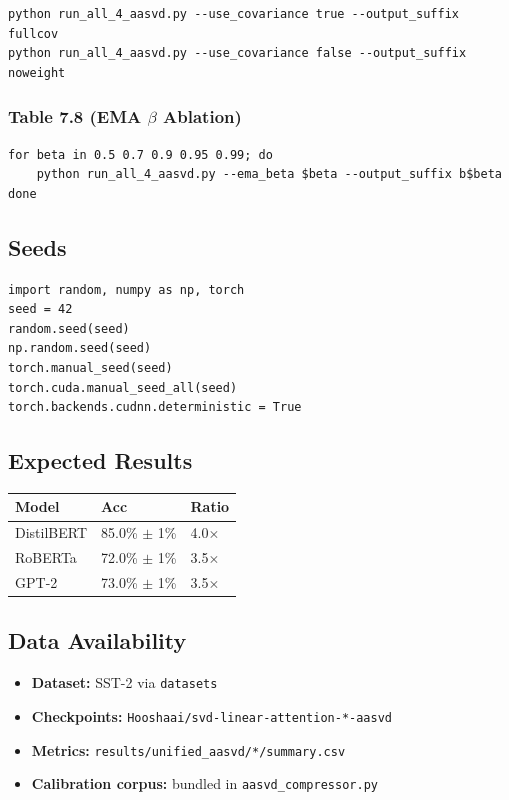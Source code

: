 \begin{lstlisting}
python run_all_4_aasvd.py --use_covariance true --output_suffix fullcov
python run_all_4_aasvd.py --use_covariance false --output_suffix noweight
\end{lstlisting}

\subsubsection{Table 7.8 (EMA $\beta$ Ablation)}

\begin{lstlisting}
for beta in 0.5 0.7 0.9 0.95 0.99; do
    python run_all_4_aasvd.py --ema_beta $beta --output_suffix b$beta
done
\end{lstlisting}

\subsection{Seeds}

\begin{lstlisting}
import random, numpy as np, torch
seed = 42
random.seed(seed)
np.random.seed(seed)
torch.manual_seed(seed)
torch.cuda.manual_seed_all(seed)
torch.backends.cudnn.deterministic = True
\end{lstlisting}

\subsection{Expected Results}

\begin{table}[H]
\centering
\small
\begin{tabular}{lll}
\toprule
\textbf{Model} & \textbf{Acc} & \textbf{Ratio} \\
\midrule
DistilBERT & 85.0\% $\pm$ 1\% & 4.0$\times$ \\
RoBERTa & 72.0\% $\pm$ 1\% & 3.5$\times$ \\
GPT-2 & 73.0\% $\pm$ 1\% & 3.5$\times$ \\
\bottomrule
\end{tabular}
\end{table}

\subsection{Data Availability}

\begin{itemize}
\item \textbf{Dataset:} SST-2 via \texttt{datasets}
\item \textbf{Checkpoints:} \texttt{Hooshaai/svd-linear-attention-*-aasvd}
\item \textbf{Metrics:} \texttt{results/unified\_aasvd/*/summary.csv}
\item \textbf{Calibration corpus:} bundled in \texttt{aasvd\_compressor.py}

\end{itemize}
